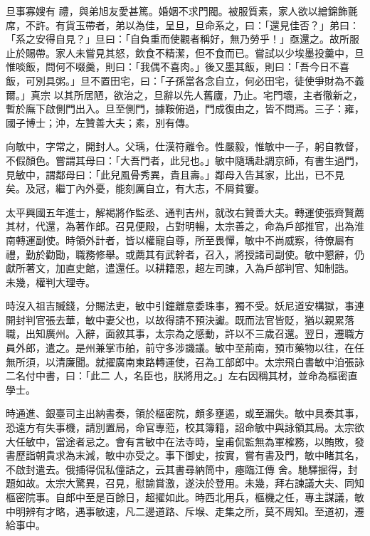 \begin{pinyinscope}
 旦事寡嫂有
 禮，與弟旭友愛甚篤。婚姻不求門閥。被服質素，家人欲以繒錦飾氈席，不許。有貨玉帶者，弟以為佳，呈旦，旦命系之，曰：「還見佳否？」弟曰：「系之安得自見？」旦曰：「自負重而使觀者稱好，無乃勞乎！」亟還之。故所服止於賜帶。家人未嘗見其怒，飲食不精潔，但不食而已。嘗試以少埃墨投羹中，旦惟啖飯，問何不啜羹，則曰：「我偶不喜肉。」後又墨其飯，則曰：「吾今日不喜飯，可別具粥。」旦不置田宅，曰：「子孫當各念自立，何必田宅，徒使爭財為不義爾。」真宗
 以其所居陋，欲治之，旦辭以先人舊廬，乃止。宅門壞，主者徹新之，暫於廡下啟側門出入。旦至側門，據鞍俯過，門成復由之，皆不問焉。三子：雍，國子博士；沖，左贊善大夫；素，別有傳。



 向敏中，字常之，開封人。父瑀，仕漢符離令。性嚴毅，惟敏中一子，躬自教督，不假顏色。嘗謂其母曰：「大吾門者，此兒也。」敏中隨瑀赴調京師，有書生過門，見敏中，謂鄰母曰：「此兒風骨秀異，貴且壽。」鄰母入告其家，比出，已不見
 矣。及冠，繼丁內外憂，能刻厲自立，有大志，不屑貧窶。



 太平興國五年進士，解褐將作監丞、通判吉州，就改右贊善大夫。轉運使張齊賢薦其材，代還，為著作郎。召見便殿，占對明暢，太宗善之，命為戶部推官，出為淮南轉運副使。時領外計者，皆以權寵自尊，所至畏憚，敏中不尚威察，待僚屬有禮，勤於勸勖，職務修舉。或薦其有武幹者，召入，將授諸司副使。敏中懇辭，仍獻所著文，加直史館，遣還任。以耕籍恩，超左司諫，入為戶部判官、知制誥。
 未幾，權判大理寺。



 時沒入祖吉贓錢，分賜法吏，敏中引鐘離意委珠事，獨不受。妖尼道安構獄，事連開封判官張去華，敏中妻父也，以故得請不預決讞。既而法官皆貶，猶以親累落職，出知廣州。入辭，面敘其事，太宗為之感動，許以不三歲召還。翌日，遷職方員外郎，遣之。是州兼掌市舶，前守多涉譏議。敏中至荊南，預市藥物以往，在任無所須，以清廉聞。就擢廣南東路轉運使，召為工部郎中。太宗飛白書敏中洎張詠二名付中書，曰：「此二
 人，名臣也，朕將用之。」左右因稱其材，並命為樞密直學士。



 時通進、銀臺司主出納書奏，領於樞密院，頗多壅遏，或至漏失。敏中具奏其事，恐遠方有失事機，請別置局，命官專蒞，校其簿籍，詔命敏中與詠領其局。太宗欲大任敏中，當途者忌之。會有言敏中在法寺時，皇甫侃監無為軍榷務，以賄敗，發書歷詣朝貴求為末減，敏中亦受之。事下御史，按實，嘗有書及門，敏中睹其名，不啟封遣去。俄捕得侃私僮詰之，云其書尋納筒中，瘞臨江傳
 舍。馳驛掘得，封題如故。太宗大驚異，召見，慰諭賞激，遂決於登用。未幾，拜右諫議大夫、同知樞密院事。自郎中至是百餘日，超擢如此。時西北用兵，樞機之任，專主謀議，敏中明辨有才略，遇事敏速，凡二邊道路、斥堠、走集之所，莫不周知。至道初，遷給事中。




\end{pinyinscope}
